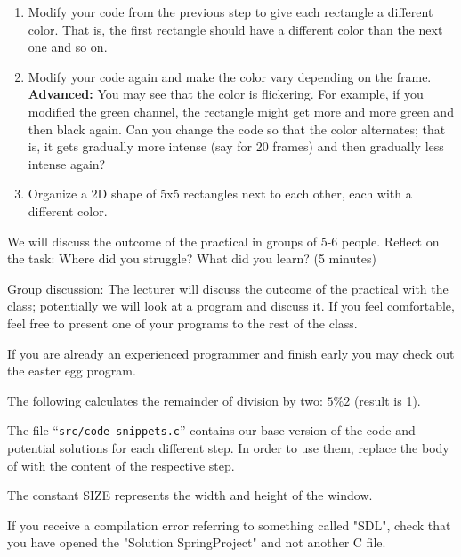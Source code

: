\begin{steps}
\begin{enumerate}
  \item Modify your code from the previous step to give each rectangle a different color. That is, the first rectangle should have a different color than the next one and so on.

  \item Modify your code again and make the color vary depending on the frame.
  \textbf{Advanced:} You may see that the color is flickering. For example, if you modified the green channel, the rectangle might get more and more green and then black again.
  Can you change the code so that the color alternates; that is, it gets gradually more intense (say for 20 frames) and then gradually less intense again?

  \item Organize a 2D shape of 5x5 rectangles next to each other, each with a different color.
  \end{enumerate}
\item We will discuss the outcome of the practical in groups of 5-6 people. Reflect on the task: Where did you struggle? What did you learn? (5 minutes)
\item Group discussion: The lecturer will discuss the outcome of the practical with the class; potentially we will look at a program and discuss it.
If you feel comfortable, feel free to present one of your programs to the rest of the class.
\end{steps}

If you are already an experienced programmer and finish early you may check out the easter egg program.

\begin{hints}
  \item The following calculates the remainder of division by two: $5 \% 2$ (result is 1).

  \item The file “\texttt{src/code-snippets.c}” contains our base version of the code and potential solutions for each different step.
  In order to use them, replace the body of  with the content of the respective step.
  \item The constant SIZE represents the width and height of the window.

  \item If you receive a compilation error referring to something called "SDL", check that you have opened the "Solution SpringProject" and not another C file.
\end{hints}

